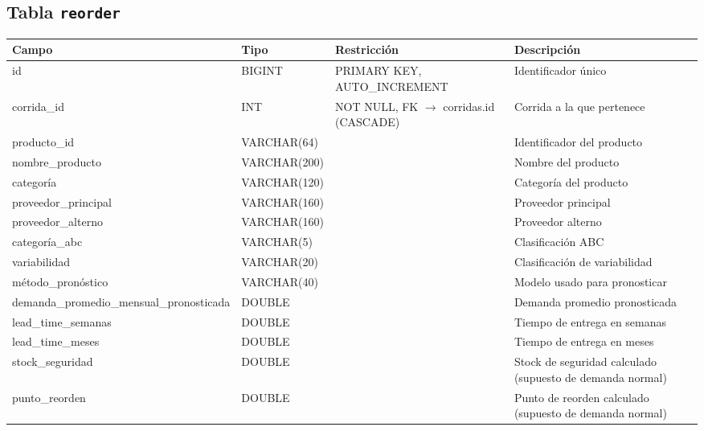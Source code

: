 \subsection*{Tabla \texttt{reorder}}
\begin{table}[H]
\centering
\renewcommand{\arraystretch}{1.3}
\begin{tabularx}{\textwidth}{|>{\raggedright\arraybackslash}p{3.0cm}|l|>{\raggedright\arraybackslash}p{3.2cm}|X|}
\hline
\textbf{Campo} & \textbf{Tipo} & \textbf{Restricción} & \textbf{Descripción} \\
\hline
id & BIGINT & PRIMARY KEY, AUTO\_\discretionary{}{}{}INCREMENT & Identificador único \\
\hline
corrida\_\discretionary{}{}{}id & INT & NOT NULL, FK $\to$ corridas.id (CASCADE) & Corrida a la que pertenece \\
\hline
producto\_\discretionary{}{}{}id & VARCHAR(64) & & Identificador del producto \\
\hline
nombre\_\discretionary{}{}{}producto & VARCHAR(200) & & Nombre del producto \\
\hline
categoría & VARCHAR(120) & & Categoría del producto \\
\hline
proveedor\_\discretionary{}{}{}principal & VARCHAR(160) & & Proveedor principal \\
\hline
proveedor\_\discretionary{}{}{}alterno & VARCHAR(160) & & Proveedor alterno \\
\hline
categoría\_\discretionary{}{}{}abc & VARCHAR(5) & & Clasificación ABC \\
\hline
variabilidad & VARCHAR(20) & & Clasificación de variabilidad \\
\hline
método\_\discretionary{}{}{}pronóstico & VARCHAR(40) & & Modelo usado para pronosticar \\
\hline
demanda\_\discretionary{}{}{}promedio\_\discretionary{}{}{}mensual\_\discretionary{}{}{}pronosticada & DOUBLE & & Demanda promedio pronosticada \\
\hline
lead\_\discretionary{}{}{}time\_\discretionary{}{}{}semanas & DOUBLE & & Tiempo de entrega en semanas \\
\hline
lead\_\discretionary{}{}{}time\_\discretionary{}{}{}meses & DOUBLE & & Tiempo de entrega en meses \\
\hline
stock\_\discretionary{}{}{}seguridad & DOUBLE & & Stock de seguridad calculado (supuesto de demanda normal) \\
\hline
punto\_\discretionary{}{}{}reorden & DOUBLE & & Punto de reorden calculado (supuesto de demanda normal) \\

\end{tabularx}
\end{table}
